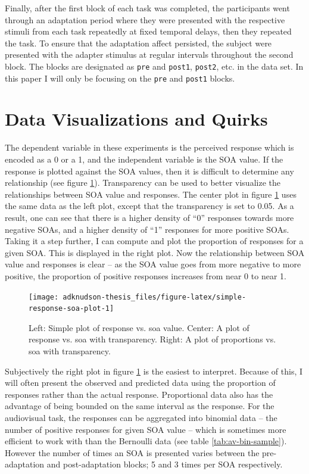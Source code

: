 \documentclass[11pt, oneside]{book}
\begin{document}
Finally, after the first block of each task was completed, the participants went through an adaptation period where they were presented with the respective stimuli from each task repeatedly at fixed temporal delays, then they repeated the task. To ensure that the adaptation affect persisted, the subject were presented with the adapter stimulus at regular intervals throughout the second block. The blocks are designated as \texttt{pre} and \texttt{post1}, \texttt{post2}, etc. in the data set. In this paper I will only be focusing on the \texttt{pre} and \texttt{post1} blocks.

\hypertarget{data-visualizations-and-quirks}{%
\section{Data Visualizations and Quirks}\label{data-visualizations-and-quirks}}

The dependent variable in these experiments is the perceived response which is encoded as a 0 or a 1, and the independent variable is the SOA value. If the response is plotted against the SOA values, then it is difficult to determine any relationship (see figure \ref{fig:simple-response-soa-plot}). Transparency can be used to better visualize the relationships between SOA value and responses. The center plot in figure \ref{fig:simple-response-soa-plot} uses the same data as the left plot, except that the transparency is set to 0.05. As a result, one can see that there is a higher density of ``0'' responses towards more negative SOAs, and a higher density of ``1'' responses for more positive SOAs. Taking it a step further, I can compute and plot the proportion of responses for a given SOA. This is displayed in the right plot. Now the relationship between SOA value and responses is clear -- as the SOA value goes from more negative to more positive, the proportion of positive responses increases from near 0 to near 1.

\begin{figure}

{\centering \texttt{[image: adknudson-thesis\_files/figure-latex/simple-response-soa-plot-1]} 

}

\caption{Left: Simple plot of response vs. soa value. Center: A plot of response vs. soa with transparency. Right: A plot of proportions vs. soa with transparency.}\label{fig:simple-response-soa-plot}
\end{figure}

Subjectively the right plot in figure \ref{fig:simple-response-soa-plot} is the easiest to interpret. Because of this, I will often present the observed and predicted data using the proportion of responses rather than the actual response. Proportional data also has the advantage of being bounded on the same interval as the response. For the audiovisual task, the responses can be aggregated into binomial data -- the number of positive responses for given SOA value -- which is sometimes more efficient to work with than the Bernoulli data (see table \ref{tab:av-bin-sample}). However the number of times an SOA is presented varies between the pre-adaptation and post-adaptation blocks; 5 and 3 times per SOA respectively.
\end{document}
